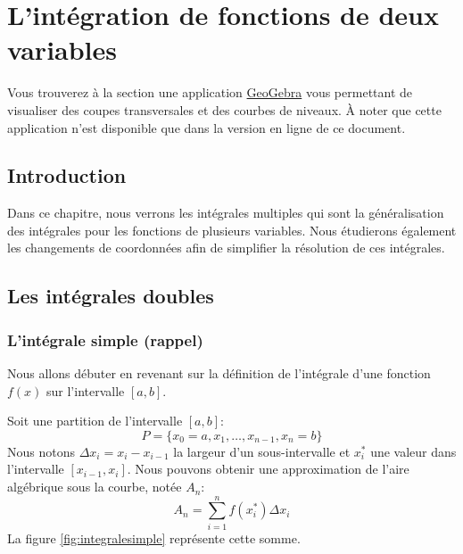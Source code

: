 \documentclass[]{book}
\theoremstyle{definition}
\theoremstyle{definition}
\theoremstyle{definition}
\theoremstyle{remark}
\begin{document}
\hypertarget{intfct2vars}{%
\chapter{L'intégration de fonctions de deux
variables}\label{intfct2vars}}

Vous trouverez à la section une application
\href{https://www.geogebra.org/?lang=fr}{GeoGebra} vous permettant de
visualiser des coupes transversales et des courbes de niveaux. À noter
que cette application n'est disponible que dans la version en ligne de
ce document.

\hypertarget{introduction-6}{%
\section{Introduction}\label{introduction-6}}

Dans ce chapitre, nous verrons les intégrales multiples qui sont la
généralisation des intégrales pour les fonctions de plusieurs variables.
Nous étudierons également les changements de coordonnées afin de
simplifier la résolution de ces intégrales.

\hypertarget{les-integrales-doubles}{%
\section{Les intégrales doubles}\label{les-integrales-doubles}}

\hypertarget{lintegrale-simple-rappel}{%
\subsection{L'intégrale simple
(rappel)}\label{lintegrale-simple-rappel}}

Nous allons débuter en revenant sur la définition de l'intégrale d'une
fonction \(f(x)\) sur l'intervalle \([a,b]\).

Soit une partition de l'intervalle \([a,b]\):
\[P=\{x_0=a,x_1,\ldots,x_{n-1},x_n=b\}\] Nous notons
\(\Delta x_i=x_i-x_{i-1}\) la largeur d'un sous-intervalle et
\(x_i^{*}\) une valeur dans l'intervalle \([x_{i-1},x_i]\). Nous pouvons
obtenir une approximation de l'aire algébrique sous la courbe, notée
\(A_n\): \[A_n=\sum_{i=1}^n f(x_i^*)\Delta x_i\] La figure
\ref{fig:integralesimple} représente cette somme.
\end{document}
